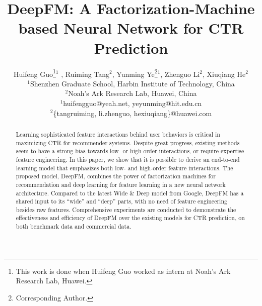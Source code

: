 \documentclass{article}
\title{DeepFM: A Factorization-Machine based Neural Network for CTR Prediction}
\author{Huifeng Guo\thanks{This work is done when Huifeng Guo worked as intern at Noah's Ark Research Lab, Huawei.}$^1$ , Ruiming Tang$^2$, Yunming Ye\thanks{Corresponding Author.}$^1$, Zhenguo Li$^2$, Xiuqiang He$^2$\\
$^1$Shenzhen Graduate School, Harbin Institute of Technology, China\\
$^2$Noah's Ark Research Lab, Huawei, China\\
$^1$huifengguo@yeah.net, yeyunming@hit.edu.cn\\
$^2$\{tangruiming, li.zhenguo, hexiuqiang\}@huawei.com
}
\begin{document}
\maketitle

\begin{abstract}
Learning sophisticated feature interactions behind user behaviors is critical in maximizing CTR for recommender systems.
Despite great progress, existing methods seem to have a strong bias towards low- or high-order interactions, or require expertise feature engineering. In this paper, we show that it is possible to derive an end-to-end learning model that emphasizes both low- and high-order feature interactions. The proposed model, DeepFM, combines the power of factorization machines for recommendation and deep learning for feature learning in a new neural network architecture. Compared to the latest Wide \& Deep model from Google, DeepFM has a shared input to its ``wide'' and ``deep'' parts, with no need of feature engineering besides raw features. Comprehensive experiments are conducted to demonstrate the effectiveness and efficiency of DeepFM over the existing models for CTR prediction, on both benchmark data and commercial data.

%


\end{abstract}
\end{document}
